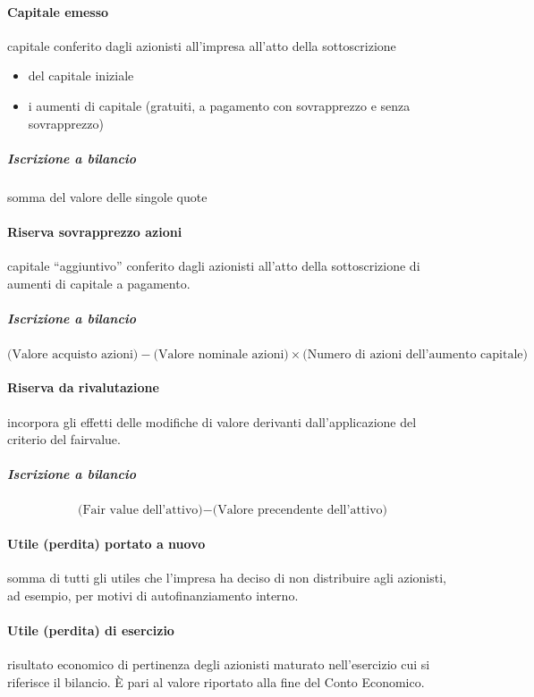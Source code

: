 \documentclass[10pt,a4paper,fleqn,oneside]{book}
\begin{document}
\paragraph{Capitale emesso} capitale conferito dagli azionisti all’impresa all’atto della sottoscrizione
\begin{itemize}
    \item del capitale iniziale
    \item i aumenti di capitale (gratuiti, a pagamento con sovrapprezzo e senza sovrapprezzo)
\end{itemize}
\subparagraph{Iscrizione a bilancio} somma del valore delle singole quote

\paragraph{Riserva sovrapprezzo azioni} capitale ``aggiuntivo'' conferito dagli
azionisti all’atto della sottoscrizione di aumenti di capitale a pagamento.
\subparagraph{Iscrizione a bilancio} 
\begin{equation*}
    \text{(Valore acquisto azioni)} - \text{(Valore nominale azioni)}
    \times \text{(Numero di azioni dell'aumento capitale)}
\end{equation*}

\paragraph{Riserva da rivalutazione} incorpora gli effetti delle modifiche di
valore derivanti dall’applicazione del criterio del \gls{fairvalue}.
\subparagraph{Iscrizione a bilancio}
\begin{equation*}
    \text{(Fair value dell'attivo)} - \text{(Valore precendente dell'attivo)}
\end{equation*}

\paragraph{Utile (perdita) portato a nuovo} somma di tutti gli \glspl{utile} che
l’impresa ha deciso di non distribuire agli azionisti, ad esempio, per motivi di
autofinanziamento interno.

\paragraph{Utile (perdita) di esercizio} risultato economico di pertinenza degli
azionisti maturato nell’esercizio cui si riferisce il bilancio.
È pari al valore riportato alla fine del Conto Economico.
\end{document}

